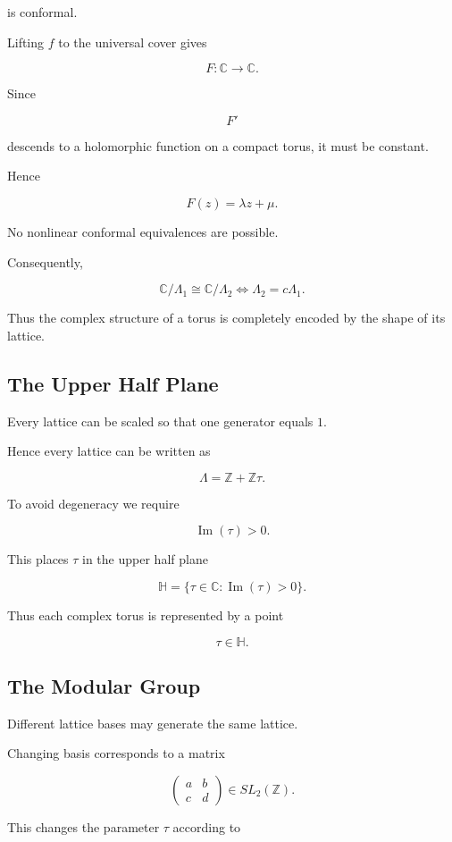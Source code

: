 \documentclass[12pt,a4paper]{article}
\theoremstyle{notespace}
\begin{document}
is conformal.

Lifting \(f\) to the universal cover gives

\[
F:\mathbb C\to\mathbb C.
\]

Since

\[
F'
\]

descends to a holomorphic function on a compact torus, it must be
constant.

Hence

\[
F(z)=\lambda z+\mu.
\]

No nonlinear conformal equivalences are possible.

Consequently,

\[
\boxed{
	\mathbb C/\Lambda_1
	\cong
	\mathbb C/\Lambda_2
	\iff
	\Lambda_2=c\Lambda_1.
}
\]

Thus the complex structure of a torus is completely encoded by the shape
of its lattice.

\subsection{The Upper Half Plane}

Every lattice can be scaled so that one generator equals \(1\).

Hence every lattice can be written as

\[
\Lambda
=
\mathbb Z+\mathbb Z\tau.
\]

To avoid degeneracy we require

\[
\operatorname{Im}(\tau)>0.
\]

This places \(\tau\) in the upper half plane

\[
\mathbb H
=
\{
\tau\in\mathbb C
:
\operatorname{Im}(\tau)>0
\}.
\]

Thus each complex torus is represented by a point

\[
\tau\in\mathbb H.
\]

\subsection{The Modular Group}

Different lattice bases may generate the same lattice.

Changing basis corresponds to a matrix

\[
\begin{pmatrix}
	a & b\\
	c & d
\end{pmatrix}
\in SL_2(\mathbb Z).
\]

This changes the parameter \(\tau\) according to
\end{document}
